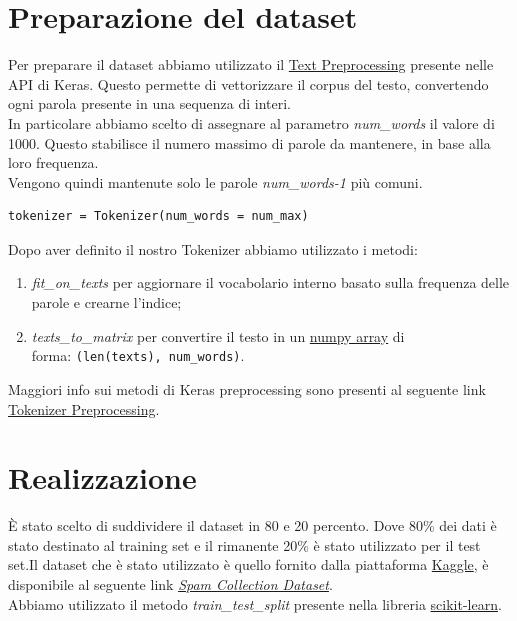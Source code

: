 \section{Preparazione del dataset}
Per preparare il dataset abbiamo utilizzato il \href{https://keras.io/preprocessing/text/#Tokenizer}{Text Preprocessing} presente nelle API di Keras. Questo permette di vettorizzare il corpus del testo, convertendo ogni parola presente in una sequenza di interi.\\
In particolare abbiamo scelto di assegnare al parametro \textit{num\_words} il valore di 1000. Questo stabilisce il numero massimo di parole da mantenere, in base alla loro frequenza.\\
Vengono quindi mantenute solo le parole \textit{num\_words-1} più comuni.
\begin{lstlisting}[backgroundcolor = \color{white}]
tokenizer = Tokenizer(num_words = num_max)
\end{lstlisting}
Dopo aver definito il nostro Tokenizer abbiamo utilizzato i metodi: 
\begin{enumerate}
	\item \textit{fit\_on\_texts} per aggiornare il vocabolario interno basato sulla frequenza delle parole e crearne l'indice;
	\item \textit{texts\_to\_matrix} per convertire il testo in un \href{https://docs.scipy.org/doc/numpy/reference/generated/numpy.array.html}{numpy array} di\\ 
	forma: \texttt{(len(texts), num\_words)}.
\end{enumerate}
Maggiori info sui metodi di Keras preprocessing sono presenti al seguente link \href{http://faroit.com/keras-docs/2.0.2/preprocessing/text/}{Tokenizer Preprocessing}.

\section{Realizzazione}
È stato scelto di suddividere il dataset in 80 e 20 percento. Dove 80\% dei dati è stato destinato al training set e il rimanente 20\% è stato utilizzato per il test set.Il dataset che è stato utilizzato è quello fornito dalla piattaforma \href{https://www.kaggle.com/}{Kaggle}, è disponibile al seguente link \href{https://www.kaggle.com/uciml/sms-spam-collection-dataset}{\textit{Spam Collection Dataset}}.\\
Abbiamo utilizzato il metodo \textit{train\_test\_split} presente nella libreria \href{https://scikit-learn.org/stable/modules/generated/sklearn.model_selection.train_test_split.html#sklearn-model-selection-train-test-split}{scikit-learn}. 


